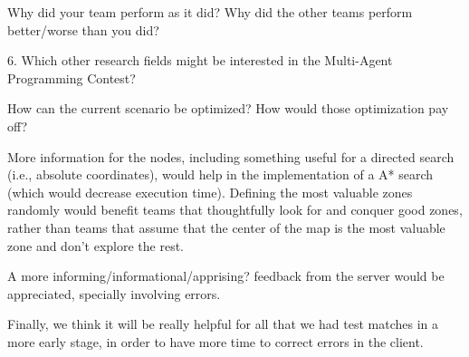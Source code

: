 \begin{question}
Why did your team perform as it did? Why did the other teams perform
better/worse than you did?
\end{question}

\begin{question}
6. Which other research fields might be interested in the Multi-Agent
Programming Contest?
\end{question}

\begin{question}
How can the current scenario be optimized? How would those optimization pay
off?
\end{question}

    More information for the nodes, including something useful for a directed
    search (i.e., absolute coordinates), would help in
    the implementation of a A* search (which would decrease execution time).
    Defining the most valuable zones randomly would benefit teams that
    thoughtfully look for and conquer good zones, rather than teams that assume
    that the center of the map is the most valuable zone and don't explore the
    rest.

    A more informing/informational/apprising? feedback from the server would
    be appreciated, specially involving errors.

    Finally, we think it will be really helpful for all that we had test
    matches in a more early stage, in order to have more time to correct
    errors in the client.
